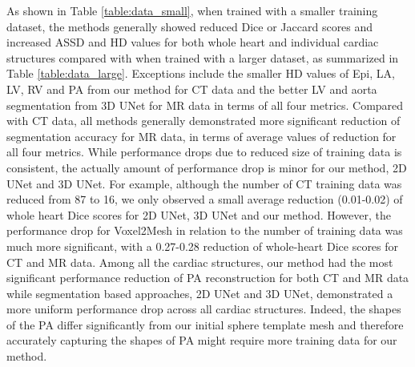 \documentclass[times,review,preprint,authoryear]{elsarticle}
\begin{document}
As shown in Table \ref{table:data_small}, when trained with a smaller training dataset, the methods generally showed reduced Dice or Jaccard scores and increased ASSD and HD values for both whole heart and individual cardiac structures compared with when trained with a larger dataset, as summarized in Table \ref{table:data_large}. Exceptions include the smaller HD values of Epi, LA, LV, RV and PA from our method for CT data and the better LV and aorta segmentation from 3D UNet for MR data in terms of all four metrics. Compared with CT data, all methods generally demonstrated more significant reduction of segmentation accuracy for MR data, in terms of average values of reduction for all four metrics. While performance drops due to reduced size of training data is consistent, the actually amount of performance drop is minor for our method, 2D UNet and 3D UNet. For example, although the number of CT training data was reduced from 87 to 16, we only observed a small average reduction (0.01-0.02) of whole heart Dice scores for 2D UNet, 3D UNet and our method. However, the performance drop for Voxel2Mesh in relation to the number of training data was much more significant, with a 0.27-0.28 reduction of whole-heart Dice scores for CT and MR data. Among all the cardiac structures, our method had the most significant performance reduction of PA reconstruction for both CT and MR data while segmentation based approaches, 2D UNet and 3D UNet, demonstrated a more uniform performance drop across all cardiac structures. Indeed, the shapes of the PA differ significantly from our initial sphere template mesh and therefore accurately capturing the shapes of PA might require more training data for our method. 
\end{document}

